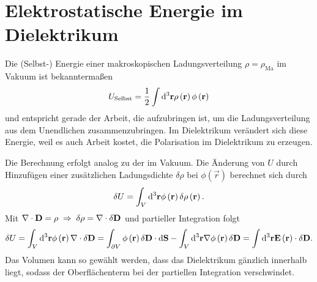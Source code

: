\section{Elektrostatische Energie im Dielektrikum}

Die (Selbst-) Energie einer makroskopischen Ladungsverteilung $\rho =\rho _{\mathrm{Ma}}$ im Vakuum ist bekanntermaßen
\begin{equation*}
	U_{\text{Selbst}}=\frac{1}{2}\int \mathop{}\!\mathrm{d} ^{3}\mathbf{r}\rho \left(\mathbf{r}\right)\phi \left(\mathbf{r}\right)
\end{equation*}
und entspricht gerade der Arbeit, die aufzubringen ist, um die Ladungsverteilung aus dem Unendlichen zusammenzubringen. Im Dielektrikum verändert sich diese Energie, weil es auch Arbeit kostet, die Polarisation im Dielektrikum zu erzeugen.

Die Berechnung erfolgt analog zu der im Vakuum. Die Änderung von $U$ durch Hinzufügen einer zusätzlichen Ladungsdichte $\delta \rho $ bei $\phi \left(\vec {r}\right)$ berechnet sich durch
\begin{equation*}
	\delta U=\int _{V}\mathop{}\!\mathrm{d} ^{3}\mathbf{r}\phi \left(\mathbf{r}\right)\delta \rho \left(\mathbf{r}\right).
\end{equation*}
Mit $\nabla \cdot \mathbf{D}=\rho \;\Rightarrow\; \delta \rho =\nabla \cdot \delta \mathbf{D}$ und partieller Integration folgt
\begin{equation*}
	\delta U=\int _{V}\mathop{}\!\mathrm{d} ^{3}\mathbf{r}\phi \left(\mathbf{r}\right)\nabla \cdot \delta \mathbf{D}=\int _{\partial V}\phi \left(\mathbf{r}\right)\delta \mathbf{D}\cdot \mathop{}\!\mathrm{d} \mathbf{S}-\int _{V}\mathop{}\!\mathrm{d} ^{3}\mathbf{r}\nabla \phi \left(\mathbf{r}\right)\delta \mathbf{D}=\int \mathop{}\!\mathrm{d} ^{3}\mathbf{r}\mathbf{E}\left(\mathbf{r}\right)\cdot \delta \mathbf{D}.
\end{equation*}
Das Volumen kann so gewählt werden, dass das Dielektrikum gänzlich innerhalb liegt, sodass der Oberflächenterm bei der partiellen Integration verschwindet.

